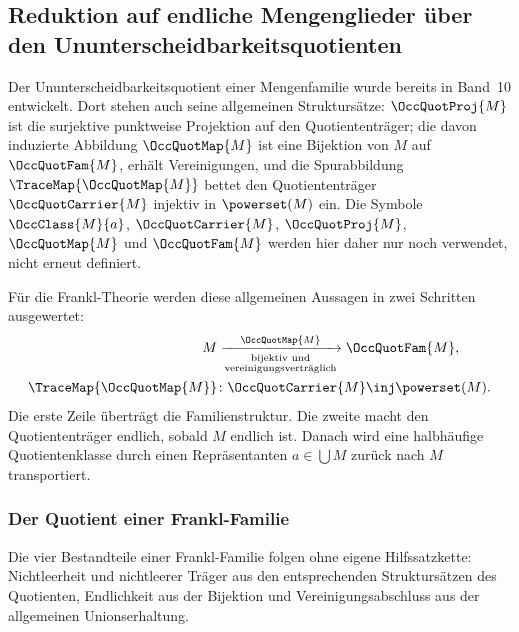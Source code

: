 \documentclass[main.tex]{subfiles}
\begin{document}
\subsection{Reduktion auf endliche Mengenglieder über den
Ununterscheidbarkeitsquotienten}

Der Ununterscheidbarkeitsquotient einer Mengenfamilie wurde bereits in
Band~10 entwickelt. Dort stehen auch seine allgemeinen Struktursätze:
\(\OccQuotProj{M}\) ist die surjektive punktweise Projektion auf den
Quotiententräger; die davon induzierte Abbildung
\(\OccQuotMap{M}\) ist eine Bijektion von \(M\) auf
\(\OccQuotFam{M}\), erhält Vereinigungen, und die Spurabbildung
\(\TraceMap{\OccQuotMap{M}}\) bettet den Quotiententräger
\(\OccQuotCarrier{M}\) injektiv in \(\powerset(M)\) ein. Die Symbole
\(\OccClass{M}{a}\), \(\OccQuotCarrier{M}\), \(\OccQuotProj{M}\),
\(\OccQuotMap{M}\) und \(\OccQuotFam{M}\) werden hier daher nur noch
verwendet, nicht erneut definiert.

Für die Frankl-Theorie werden diese allgemeinen Aussagen in zwei Schritten
ausgewertet:
\[
\begin{aligned}
M
&\xrightarrow[\substack{\text{bijektiv und}\\
  \text{vereinigungsverträglich}}]{\ \OccQuotMap{M}\ }
  \OccQuotFam{M},
\\
\TraceMap{\OccQuotMap{M}}
&\colon \OccQuotCarrier{M}\inj\powerset(M).
\end{aligned}
\]
Die erste Zeile überträgt die Familienstruktur. Die zweite macht den
Quotiententräger endlich, sobald \(M\) endlich ist. Danach wird eine
halbhäufige Quotientenklasse durch einen Repräsentanten
\(a\in\bigcup M\) zurück nach \(M\) transportiert.

\subsubsection{Der Quotient einer Frankl-Familie}

Die vier Bestandteile einer Frankl-Familie folgen ohne eigene Hilfssatzkette:
Nichtleerheit und nichtleerer Träger aus den entsprechenden
Struktursätzen des Quotienten, Endlichkeit aus der Bijektion und
Vereinigungsabschluss aus der allgemeinen Unionserhaltung.
\end{document}
